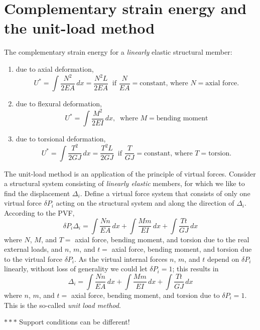\section{Complementary strain energy and the unit-load method}
The complementary strain energy for a \emph{linearly} elastic structural member:
\begin{enumerate}[label=(\alph*)]
  \item due to axial deformation,
    \begin{equation*}
      U^* = \int\frac{N^2}{2EA}\,dx = \frac{N^2L}{2EA}\ \text{ if } \frac{N}{EA} = \text{constant, where } N = \text{axial force.}
    \end{equation*}
  \item due to flexural deformation,
    \begin{equation*}
      U^* = \int\frac{M^2}{2EI}\,dx,\ \text{ where } M = \text{bending moment}
    \end{equation*}
  \item due to torsional deformation,
    \begin{equation*}
      U^* = \int\frac{T^2}{2GJ}\,dx = \frac{T^2L}{2GJ}\ \text{ if } \frac{T}{GJ} = \text{constant, where } T = \text{torsion.}
    \end{equation*}
\end{enumerate}
The unit-load method is an application of the principle of virtual forces. Consider a structural system consisting of \emph{linearly elastic} members, for which we like to find the displacement $\Delta_i$. Define a virtual force system that consists of only one virtual force $\delta P_i$ acting on the structural system and along the direction of $\Delta_i$. According to the PVF,
\begin{equation}
  \delta P_i\Delta_i = \int\frac{Nn}{EA}\,dx + \int\frac{Mm}{EI}\,dx + \int\frac{Tt}{GJ}\,dx
\end{equation}
where $N$, $M$, and $T =$ axial force, bending moment, and torsion due to the real external loads, and $n$, $m$, and $t =$ axial force, bending moment, and torsion due to the virtual force $\delta P_i$. As the virtual internal forces $n$, $m$, and $t$ depend on $\delta P_i$ linearly, without loss of generality we could let $\delta P_i = 1$; this results in
\begin{equation}
  \Delta_i = \int\frac{Nn}{EA}\,dx + \int\frac{Mm}{EI}\,dx + \int\frac{Tt}{GJ}\,dx
\end{equation}
where $n$, $m$, and $t =$ axial force, bending moment, and torsion due to $\delta P_i = 1$. This is the so-called \emph{unit load method}.
\begin{fig}
  
\end{fig}
\noindent$***$ Support conditions can be different!

